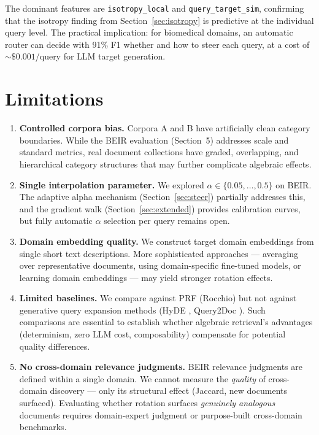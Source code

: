 \documentclass{article}
\begin{document}
\noindent The dominant features are \texttt{isotropy\_local} and \texttt{query\_target\_sim}, confirming that the isotropy finding from Section~\ref{sec:isotropy} is predictive at the individual query level. The practical implication: for biomedical domains, an automatic router can decide with 91\% F1 whether and how to steer each query, at a cost of ${\sim}\$0.001$/query for LLM target generation.

\section{Limitations}

\begin{enumerate}
\item \textbf{Controlled corpora bias.} Corpora A and B have artificially clean category boundaries. While the BEIR evaluation (Section~5) addresses scale and standard metrics, real document collections have graded, overlapping, and hierarchical category structures that may further complicate algebraic effects.

\item \textbf{Single interpolation parameter.} We explored $\alpha \in \{0.05, \ldots, 0.5\}$ on BEIR. The adaptive alpha mechanism (Section~\ref{sec:steer}) partially addresses this, and the gradient walk (Section~\ref{sec:extended}) provides calibration curves, but fully automatic $\alpha$ selection per query remains open.

\item \textbf{Domain embedding quality.} We construct target domain embeddings from single short text descriptions. More sophisticated approaches --- averaging over representative documents, using domain-specific fine-tuned models, or learning domain embeddings --- may yield stronger rotation effects.

\item \textbf{Limited baselines.} We compare against PRF (Rocchio) but not against generative query expansion methods (HyDE \cite{gao2023hyde}, Query2Doc \cite{wang2023query2doc}). Such comparisons are essential to establish whether algebraic retrieval's advantages (determinism, zero LLM cost, composability) compensate for potential quality differences.

\item \textbf{No cross-domain relevance judgments.} BEIR relevance judgments are defined within a single domain. We cannot measure the \emph{quality} of cross-domain discovery --- only its structural effect (Jaccard, new documents surfaced). Evaluating whether rotation surfaces \emph{genuinely analogous} documents requires domain-expert judgment or purpose-built cross-domain benchmarks.
\end{enumerate}
\end{document}
